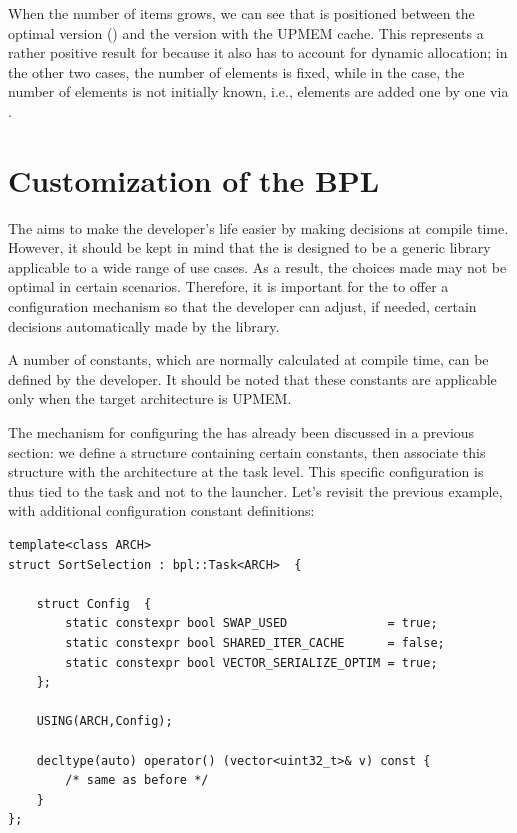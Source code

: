  When the number of items grows, we can see that  is positioned between the optimal version ()  
 and the version with the UPMEM cache. 
 This represents a rather positive result for  because it also has to account for dynamic allocation; 
 in the other two cases, the number of elements is fixed, while in the  case, the number of elements 
 is not initially known, i.e., elements are added one by one via . 

 
 
\section{Customization of the BPL}

The \BPL aims to make the developer's life easier by making decisions at compile time. 
However, it should be kept in mind that the \BPL is designed to be a generic library applicable 
to a wide range of use cases. As a result, the choices made may not be optimal in certain scenarios. 
Therefore, it is important for the \BPL to offer a configuration mechanism so that the developer can adjust, 
if needed, certain decisions automatically made by the library.  

A number of constants, which are normally calculated at compile time, can be defined by the developer. 
It should be noted that these constants are applicable only when the target architecture is UPMEM.

The mechanism for configuring the \BPL has already been discussed in a previous section: 
we define a structure containing certain constants, then associate this structure with the architecture at the task level. 
This specific configuration is thus tied to the task and not to the launcher.
Let’s revisit the previous example, with additional configuration constant definitions:
\begin{verbatim}
template<class ARCH>
struct SortSelection : bpl::Task<ARCH>  {
	
    struct Config  {
        static constexpr bool SWAP_USED              = true;
        static constexpr bool SHARED_ITER_CACHE      = false;
        static constexpr bool VECTOR_SERIALIZE_OPTIM = true;
    };
	
    USING(ARCH,Config);

    decltype(auto) operator() (vector<uint32_t>& v) const { 
        /* same as before */
    }
};
\end{verbatim}

